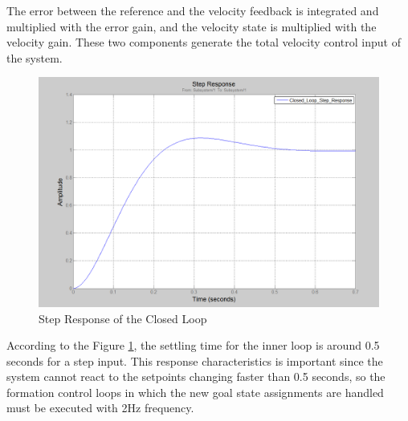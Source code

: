 The error between the reference and the velocity feedback is integrated and multiplied with the error gain, and the velocity state is multiplied with the velocity gain. These two components generate the total velocity control input of the system.  

\begin{figure}[H]
\caption{Step Response of the Closed Loop} \label{Stepresp}
\centering
\includegraphics[scale = 0.40]{step_resp}
\end{figure}

According to the Figure \ref{Stepresp}, the settling time for the inner loop is around 0.5 seconds for a step input. This response characteristics is important since the system cannot react to the setpoints changing faster than 0.5 seconds, so the formation control loops in which the new goal state assignments are handled must be executed with 2Hz frequency.